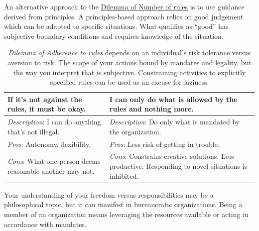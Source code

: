 
An alternative approach to the  \hyperref[table:number-of-rules]{Dilemma of Number of rules}
is to use guidance derived from principles. A principles-based approach relies on good judgement which can be adapted to specific situations. What qualifies as ``good'' has subjective boundary conditions and requires knowledge of the situation.



\begin{center}
\begin{table}[H] %
\begin{tabular}{ | m{\dilemmatablewidth}| m{\dilemmatablewidth} | } 
  \hline
  \textbf{If it's not against the rules, it must be okay.} & 
  \textbf{I can only do what is allowed by the rules and nothing more.} \\ 
  \hline
  \textit{Description}: I can do anything that's not illegal. &
  \textit{Description}: Do only what is mandated by the organization. \\
  \hline
  \textit{Pros}: Autonomy, flexibility. &
  \textit{Pros}: Less risk of getting in trouble. \\
  \hline
  \textit{Cons}: What one person deems reasonable another may not. & 
  \textit{Cons}: Constrains creative solutions. Less productive. Responding to novel situations is inhibited. \\  
  \hline
\end{tabular}
\caption{
\textit{Dilemma of Adherence to rules} depends on an individual's risk tolerance versus aversion to risk. 
The scope of your actions bound by mandates and legality, but the way you interpret that is subjective. 
Constraining activities to explicitly specified rules can be used as an excuse for laziness. 
}
\label{table:rule-adherence}
\end{table}
\end{center}

Your understanding of your freedom versus responsibilities may be a philosophical topic, but it can manifest in bureaucratic organizations. Being a member of an organization means leveraging the resources available or acting in accordance with mandates. 


